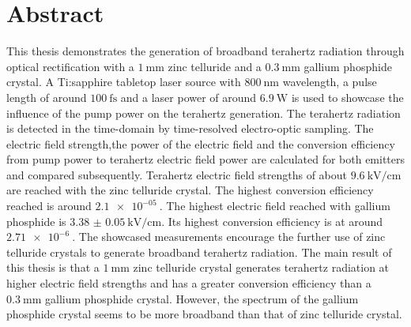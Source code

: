 \thispagestyle{plain}

\section*{Abstract}

This thesis demonstrates the generation of broadband terahertz radiation through optical rectification with a $\SI{1}{\milli\meter}$ zinc telluride and a $\SI{0.3}{\milli\meter}$ gallium phosphide crystal.
A Ti:sapphire tabletop laser source with $\SI{800}{\nano\meter}$ wavelength, a pulse length of around $\SI{100}{\femto\second}$ and a laser power of around $\SI{6.9}{\W}$ is used to showcase the influence of the pump power on the terahertz generation.
The terahertz radiation is detected in the time-domain by time-resolved electro-optic sampling.
The electric field strength,the power of the electric field and the conversion efficiency from pump power to terahertz electric field power are calculated for both emitters and compared subsequently.
Terahertz electric field strengths of about $\SI{9.6}{\kilo\V\per\centi\meter}$ are reached with the zinc telluride crystal.
The highest conversion efficiency reached is around $\SI{2.1e-05}{}$.
The highest electric field reached with gallium phosphide is $\SI{3.38(5)}{\kilo\V\per\centi\meter}$.
Its highest conversion efficiency is at around $\SI{2.71e-6}{}$.
The showcased measurements encourage the further use of zinc telluride crystals to generate broadband terahertz radiation.
The main result of this thesis is that a $\SI{1}{\milli\meter}$ zinc telluride crystal generates terahertz radiation at higher electric field strengths and has a greater conversion efficiency than a $\SI{0.3}{\milli\meter}$ gallium phosphide crystal. 
However, the spectrum of the gallium phosphide crystal seems to be more broadband than that of zinc telluride crystal.
